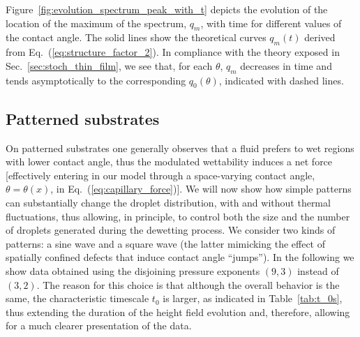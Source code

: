 Figure~\ref{fig:evolution_spectrum_peak_with_t} depicts the evolution of the location of the maximum of the spectrum, $q_m$, with time for different values of the contact angle.
The solid lines show the theoretical curves $q_m(t)$ derived from Eq.~(\ref{eq:structure_factor_2}).
In compliance with the theory exposed in Sec.~\ref{sec:stoch_thin_film}, we see that, for each $\theta$, $q_m$ decreases in time and tends asymptotically to the corresponding $q_0(\theta)$, indicated with dashed lines.

\subsection{Patterned substrates}\label{subsec:patterned_substrates}
On patterned substrates one generally observes that a fluid prefers to wet regions with lower contact angle, thus the modulated wettability induces a net force [effectively entering in our model through a space-varying contact angle, $\theta=\theta(x)$, in Eq.~(\ref{eq:capillary_force})].
We will now show how simple patterns can substantially change the droplet distribution, with and without thermal fluctuations, thus allowing, in principle, to control both the size and the number of droplets generated during the dewetting process.
We consider two kinds of patterns: a sine wave and a square wave (the latter mimicking the effect of spatially confined defects that induce contact angle ``jumps'').
In the following we show data obtained using the disjoining pressure exponents $(9,3)$ instead of $(3,2)$.
The reason for this choice is that although the overall behavior is the same, the characteristic timescale $t_0$ is larger, as indicated in Table~\ref{tab:t_0s}, thus extending the duration of the height field evolution and, therefore, allowing for a much clearer presentation of the data.

